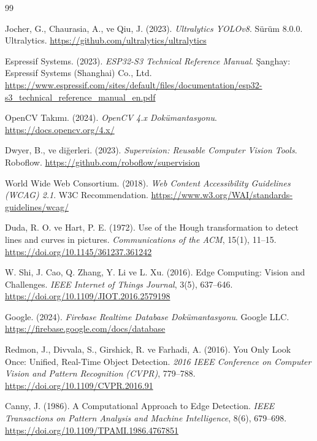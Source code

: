 \begin{thebibliography}{99}

Jocher, G., Chaurasia, A., ve Qiu, J. (2023).
\textit{Ultralytics YOLOv8}.
Sürüm 8.0.0. Ultralytics.
\url{https://github.com/ultralytics/ultralytics}

Espressif Systems. (2023).
\textit{ESP32-S3 Technical Reference Manual}.
Şanghay: Espressif Systems (Shanghai) Co., Ltd.
\url{https://www.espressif.com/sites/default/files/documentation/esp32-s3_technical_reference_manual_en.pdf}

OpenCV Takımı. (2024).
\textit{OpenCV 4.x Dokümantasyonu}.
\url{https://docs.opencv.org/4.x/}

Dwyer, B., ve diğerleri. (2023).
\textit{Supervision: Reusable Computer Vision Tools}.
Roboflow.
\url{https://github.com/roboflow/supervision}

World Wide Web Consortium. (2018).
\textit{Web Content Accessibility Guidelines (WCAG) 2.1}.
W3C Recommendation.
\url{https://www.w3.org/WAI/standards-guidelines/wcag/}

Duda, R. O. ve Hart, P. E. (1972).
Use of the Hough transformation to detect lines and curves in pictures.
\textit{Communications of the ACM}, 15(1), 11--15.
\url{https://doi.org/10.1145/361237.361242}

W. Shi, J. Cao, Q. Zhang, Y. Li ve L. Xu. (2016).
Edge Computing: Vision and Challenges.
\textit{IEEE Internet of Things Journal}, 3(5), 637--646.
\url{https://doi.org/10.1109/JIOT.2016.2579198}

Google. (2024).
\textit{Firebase Realtime Database Dokümantasyonu}.
Google LLC.
\url{https://firebase.google.com/docs/database}

Redmon, J., Divvala, S., Girshick, R. ve Farhadi, A. (2016).
You Only Look Once: Unified, Real-Time Object Detection.
\textit{2016 IEEE Conference on Computer Vision and Pattern Recognition (CVPR)}, 779--788.
\url{https://doi.org/10.1109/CVPR.2016.91}

Canny, J. (1986).
A Computational Approach to Edge Detection.
\textit{IEEE Transactions on Pattern Analysis and Machine Intelligence}, 8(6), 679--698.
\url{https://doi.org/10.1109/TPAMI.1986.4767851}

\end{thebibliography}
